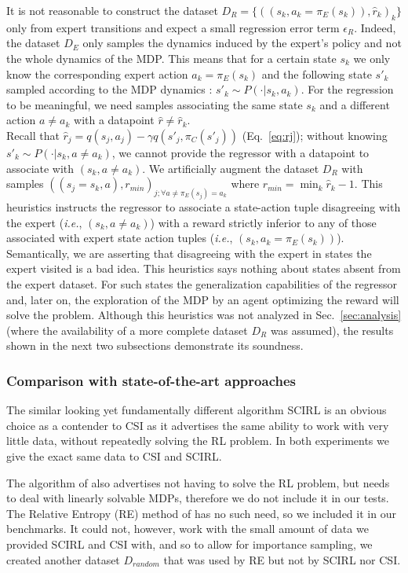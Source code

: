 \documentclass{llncs}
\begin{document}
It is not reasonable to construct the dataset $D_R = \{((s_k,a_k=\pi_E(s_k)),\hat r_k)_k\}$ only from expert transitions and expect a small regression error term $\epsilon_R$. Indeed, the dataset $D_E$ only samples the dynamics induced by the expert's policy and not the whole dynamics of the MDP. 
This means that for a certain state $s_k$ we only know the corresponding expert action $a_k=\pi_E(s_k)$ and the following state $s'_k$ sampled according to the MDP dynamics : $s'_k \sim P(\cdot|s_k,a_k)$. For the regression to be meaningful, we need samples associating the same state $s_k$ and a different action $a\neq a_k$ with a datapoint $\hat r \neq \hat r_k$.\\
Recall that $\hat r_j = q(s_j,a_j) - \gamma q(s'_j,\pi_C(s'_j))$ (Eq.~\eqref{eq:rj}); without knowing $s'_k \sim P(\cdot|s_k,a\neq a_k)$, we cannot provide the regressor with a datapoint to associate with $(s_k,a\neq a_k)$.
We artificially augment the dataset $D_R$ with samples $((s_j=s_k,a),r_{min})_{j;\forall a\neq \pi_E(s_j) = a_k}$ where
$  r_{min} = \min_k\hat r_k - 1$.
This heuristics instructs the regressor to associate a state-action tuple disagreeing with the expert ({\it i.e.}, $(s_k,a\neq a_k)$) with a reward strictly inferior to any of those associated with expert state action tuples ({\it i.e.}, $(s_k,a_k=\pi_E(s_k))$). Semantically, we are asserting that disagreeing with the expert in states the expert visited is a bad idea. This heuristics says nothing about states absent from the expert dataset. For such states the generalization capabilities of the regressor and, later on, the exploration of the MDP by an agent optimizing the reward will solve the problem.
Although this heuristics was not analyzed in Sec.~\ref{sec:analysis} (where the availability of a more complete dataset $D_R$ was assumed), the results shown in the next two subsections demonstrate its soundness.
\subsubsection{Comparison with state-of-the-art approaches}
The similar looking yet fundamentally different algorithm SCIRL \cite{klein2012scirl} is an obvious choice as a contender to CSI as it advertises the same ability to work with very little data, without repeatedly solving the RL problem. In both experiments we give the exact same data to CSI and SCIRL.

The algorithm of \cite{dvijotham2010inverse} also advertises not having to solve the RL problem, but needs to deal with linearly solvable MDPs, therefore we do not include it in our tests. The Relative Entropy (RE) method of \cite{boularias2011relative} has no such need, so we included it in our benchmarks. It could not, however, work with the small amount of data we provided SCIRL and CSI with, and so to allow for importance sampling, we created another dataset $D_{random}$ that was used by RE but not by SCIRL nor CSI.
\end{document}
